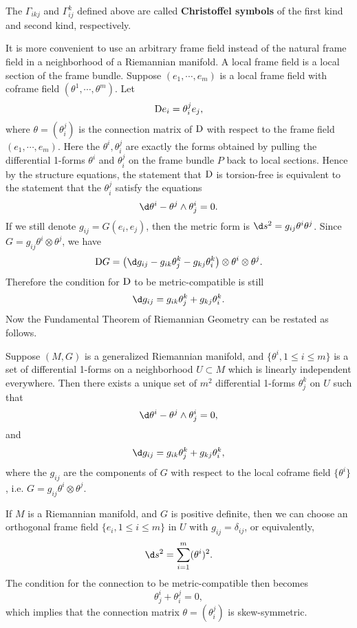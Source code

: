 \documentclass[11pt]{article}
\begin{document}
The $\Gamma_{ikj}$ and $\Gamma^k_{ij}$ defined above are called \textbf{Christoffel symbols} of the first kind and second kind, respectively. 

It is more convenient to use an arbitrary frame field instead of the natural frame field in a neighborhood of a Riemannian manifold. A local frame field is a local section of the frame bundle. Suppose $(e_1, \cdots, e_m)$ is a local frame field with coframe field $(\theta^1, \cdots, \theta^m)$. Let $$\text{D} e_i = \theta^j_i e_j,$$ where $\theta = (\theta^j_i)$ is the connection matrix of $\text{D}$ with respect to the frame field $(e_1, \cdots, e_m)$. Here the $\theta^i, \theta^j_i$ are exactly the forms obtained by pulling the differential 1-forms $\theta^i$ and $\theta^j_i$ on the frame bundle $P$ back to local sections. Hence by the structure equations, the statement that $\text{D}$ is torsion-free is equivalent to the statement that the $\theta^j_i$ satisfy the equations $$\d\theta^i - \theta^j \wedge \theta^i_j = 0.$$ If we still denote $g_{ij} = G(e_i, e_j)$, then the metric form is $\d s^2 = g_{ij}\theta^i\theta^j$. Since $G = g_{ij}\theta^i\otimes\theta^j$, we have $$\D G = \left(\d g_{ij} - g_{ik}\theta^k_j - g_{kj}\theta^k_i\right)\otimes \theta^i \otimes \theta^j.$$ Therefore the condition for $\text{D}$ to be metric-compatible is still $$\d g_{ij} = g_{ik}\theta^k_j + g_{kj}\theta^k_i.$$ Now the Fundamental Theorem of Riemannian Geometry can be restated as follows.

\begin{theorem}
    Suppose $(M, G)$ is a generalized Riemannian manifold, and $\{\theta^i, 1 \le i \le m\}$ is a set of differential 1-forms on a neighborhood $U \subset M$ which is linearly independent everywhere. Then there exists a unique set of $m^2$ differential 1-forms $\theta^k_j$ on $U$ such that $$\d\theta^i - \theta^j \wedge \theta^i_j = 0,$$ and $$\d g_{ij} = g_{ik}\theta^k_j + g_{kj}\theta^k_i,$$ where the $g_{ij}$ are the components of $G$ with respect to the local coframe field $\{\theta^i\}$, i.e. $G = g_{ij}\theta^i \otimes \theta^j.$
\end{theorem}

If $M$ is a Riemannian manifold, and $G$ is positive definite, then we can choose an orthogonal frame field $\{e_i, 1 \le i \le m\}$ in $U$ with $g_{ij} = \delta_{ij}$, or equivalently, $$\d s^2 = \sum_{i=1}^m (\theta^i)^2.$$ The condition for the connection to be metric-compatible then becomes $$\theta^i_j + \theta^j_i = 0,$$ which implies that the connection matrix $\theta = (\theta^j_i)$ is skew-symmetric. 
\end{document}
